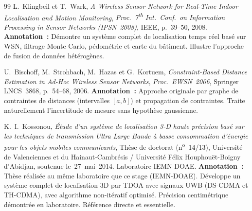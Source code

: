\documentclass[12pt, a4paper]{article}
\begin{document}
\begin{thebibliography}{99}
L.~Klingbeil et T.~Wark,
\textit{A Wireless Sensor Network for Real-Time Indoor Localisation and Motion Monitoring},
\textit{Proc.\ 7\textsuperscript{th} Int.\ Conf.\ on Information Processing in Sensor Networks (IPSN~2008)},
IEEE, p.~39--50, 2008.
\newline\textbf{Annotation~:} Démontre un système complet de localisation temps réel basé sur WSN, filtrage Monte Carlo, pédométrie et carte du bâtiment. Illustre l'approche de fusion de données hétérogènes.

U.~Bischoff, M.~Strohbach, M.~Hazas et G.~Kortuem,
\textit{Constraint-Based Distance Estimation in Ad-Hoc Wireless Sensor Networks},
\textit{Proc.\ EWSN~2006}, Springer LNCS~3868, p.~54--68, 2006.
\newline\textbf{Annotation~:} Approche originale par graphe de contraintes de distances (intervalles $[a,b]$) et propagation de contraintes. Traite naturellement l'incertitude de mesure sans hypothèse gaussienne.

K.~I.~Kossonou,
\textit{Étude d'un système de localisation 3-D haute précision basé sur les techniques de transmission Ultra Large Bande à basse consommation d'énergie pour les objets mobiles communicants},
Thèse de doctorat (n\textsuperscript{o}~14/13),
Université de Valenciennes et du Hainaut-Cambrésis / Université Félix Houphouët-Boigny d'Abidjan,
soutenue le~27~mai~2014. Laboratoire IEMN-DOAE.
\newline\textbf{Annotation~:} Thèse réalisée au même laboratoire que ce stage (IEMN-DOAE). Développe un système complet de localisation 3D par TDOA avec signaux UWB (DS-CDMA et TH-CDMA), avec algorithme non-itératif optimisé. Précision centimétrique démontrée en laboratoire. Référence directe et essentielle.

\end{thebibliography}
\end{document}
